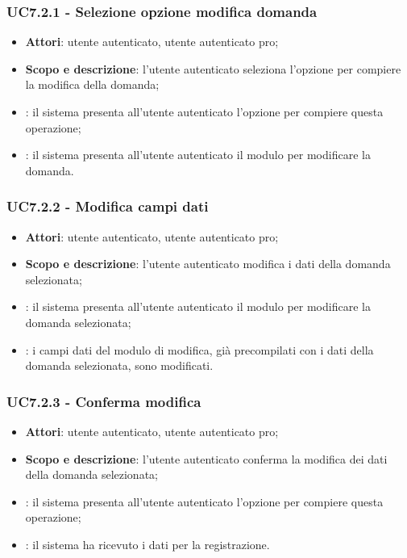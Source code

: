 	\subsubsection{UC7.2.1 - Selezione opzione modifica domanda}
	\begin{itemize}
		\item
			\textbf{Attori}: utente autenticato, utente autenticato pro;
		\item
			\textbf{Scopo e descrizione}: l'utente autenticato seleziona l'opzione per compiere la modifica della domanda;
		\item		
			: il sistema presenta all'utente autenticato l'opzione per compiere questa operazione;
		\item
			: il sistema presenta all'utente autenticato il modulo per modificare la domanda.
	\end{itemize}
	\subsubsection{UC7.2.2 - Modifica campi dati}
	\begin{itemize}
		\item
			\textbf{Attori}: utente autenticato, utente autenticato pro;
		\item
			\textbf{Scopo e descrizione}: l'utente autenticato modifica i dati della domanda selezionata;
		\item		
			: il sistema presenta all'utente autenticato il modulo per modificare la domanda selezionata;
		\item
			: i campi dati del modulo di modifica, già precompilati con i dati della domanda selezionata, sono modificati.
	\end{itemize}		
	\subsubsection{UC7.2.3 - Conferma modifica}
	\begin{itemize}
		\item
			\textbf{Attori}: utente autenticato, utente autenticato pro;
		\item
			\textbf{Scopo e descrizione}: l'utente autenticato conferma la modifica dei dati della domanda selezionata;
		\item		
			: il sistema presenta all'utente autenticato l'opzione per compiere questa operazione;
		\item
			: il sistema ha ricevuto i dati per la registrazione.
	\end{itemize}		
